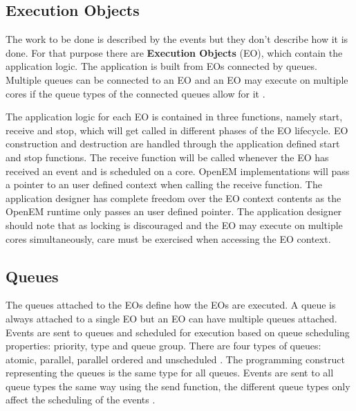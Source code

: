 \subsection{Execution Objects}
\label{subsec:eos}
The work to be done is described by the events but they don't describe how it is done. For that purpose there are \textbf{Execution Objects} (EO), which contain the application logic. The application is built from EOs connected by queues. Multiple queues can be connected to an EO and an EO may execute on multiple cores if the queue types of the connected queues allow for it . \cite{openemintro}

The application logic for each EO is contained in three functions, namely start, receive and stop, which will get called in different phases of the EO lifecycle. EO construction and destruction are handled through the application defined start and stop functions. The receive function will be called whenever the EO has received an event and is scheduled on a core. \cite{openemintro} OpenEM implementations will pass a pointer to an user defined context when calling the receive function. The application designer has complete freedom over the EO context contents as the OpenEM runtime only passes an user defined pointer. \cite{openemintro} The application designer should note that as locking is discouraged and the EO may execute on multiple cores simultaneously, care must be exercised when accessing the EO context.

\subsection{Queues}
\label{subsec:queues}
The queues attached to the EOs define how the EOs are executed. A queue is always attached to a single EO but an EO can have multiple queues attached. Events are sent to queues and scheduled for execution based on queue scheduling properties: priority, type and queue group. \cite{openemintro} There are four types of queues: atomic, parallel, parallel ordered and unscheduled \cite{openemintro}. The programming construct representing the queues is the same type for all queues. Events are sent to all queue types the same way using the send function, the different queue types only affect the scheduling of the events \cite{openemintro}.

